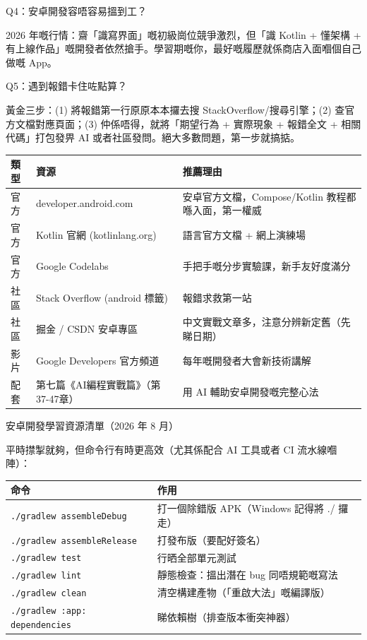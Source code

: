 Q4：安卓開發容唔容易搵到工？

2026 年嘅行情：齋「識寫界面」嘅初級崗位競爭激烈，但「識 Kotlin + 懂架構 + 有上線作品」嘅開發者依然搶手。學習期嘅你，最好嘅履歷就係商店入面嗰個自己做嘅 App。

Q5：遇到報錯卡住咗點算？

黃金三步：(1) 將報錯第一行原原本本攞去搜 StackOverflow/搜尋引擎；(2) 查官方文檔對應頁面；(3) 仲係唔得，就將「期望行為 + 實際現象 + 報錯全文 + 相關代碼」打包發畀 AI 或者社區發問。絕大多數問題，第一步就搞掂。


\begin{center}
\begin{tabularx}{\linewidth}{|X|X|X|}
\hline
\textbf{類型} & \textbf{資源} & \textbf{推薦理由} \tabularnewline
\hline
官方 & developer.android.com & 安卓官方文檔，Compose/Kotlin 教程都喺入面，第一權威 \tabularnewline
官方 & Kotlin 官網 (kotlinlang.org) & 語言官方文檔 + 網上演練場 \tabularnewline
官方 & Google Codelabs & 手把手嘅分步實驗課，新手友好度滿分 \tabularnewline
社區 & Stack Overflow (android 標籤) & 報錯求救第一站 \tabularnewline
社區 & 掘金 / CSDN 安卓專區 & 中文實戰文章多，注意分辨新定舊（先睇日期） \tabularnewline
影片 & Google Developers 官方頻道 & 每年嘅開發者大會新技術講解 \tabularnewline
配套 & 第七篇《AI編程實戰篇》（第37-47章） & 用 AI 輔助安卓開發嘅完整心法 \tabularnewline
\hline
\end{tabularx}
\end{center}

\begin{center}\small\color{gray}安卓開發學習資源清單（2026 年 8 月）\end{center}


平時㩒掣就夠，但命令行有時更高效（尤其係配合 AI 工具或者 CI 流水線嗰陣）：

\begin{center}
\begin{tabularx}{\linewidth}{|X|X|}
\hline
\textbf{命令} & \textbf{作用} \tabularnewline
\hline
\texttt{.\allowbreak /\allowbreak gradlew assembleDebug} & 打一個除錯版 APK（Windows 記得將 ./ 攞走） \tabularnewline
\texttt{.\allowbreak /\allowbreak gradlew assembleRelease} & 打發布版（要配好簽名） \tabularnewline
\texttt{.\allowbreak /\allowbreak gradlew test} & 行晒全部單元測試 \tabularnewline
\texttt{.\allowbreak /\allowbreak gradlew lint} & 靜態檢查：搵出潛在 bug 同唔規範嘅寫法 \tabularnewline
\texttt{.\allowbreak /\allowbreak gradlew clean} & 清空構建產物（「重啟大法」嘅編譯版） \tabularnewline
\texttt{.\allowbreak /\allowbreak gradlew :app: dependencies} & 睇依賴樹（排查版本衝突神器） \tabularnewline
\hline
\end{tabularx}
\end{center}

